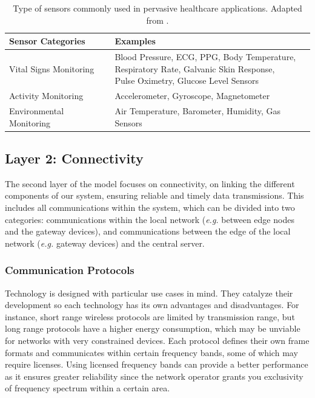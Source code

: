 \renewcommand{\arraystretch}{2}
\begin{table}[H]
    \centering
    \begin{tabular}{l|l}
        \textbf{Sensor Categories} & \textbf{Examples} \\ 
        \hline
        Vital Signs Monitoring & \makecell{Blood Pressure, \acs{ECG}, PPG, Body Temperature, \\ Respiratory Rate, Galvanic Skin Response, \\ Pulse Oximetry, Glucose Level Sensors} \\
        Activity Monitoring & Accelerometer, Gyroscope, Magnetometer\\
        Environmental Monitoring & Air Temperature, Barometer, Humidity, Gas Sensors \\
    \end{tabular}
    \caption[Type of sensors commonly used in pervasive healthcare applications.]{Type of sensors commonly used in pervasive healthcare applications. Adapted from \cite{MinhDang2019}.}
    \label{tab:layer1-sensors} 
\end{table}
\renewcommand{\arraystretch}{1}

\subsection{Layer 2: Connectivity}
\label{sec:iot-model-layer2}

The second layer of the model focuses on connectivity, on linking the different components of our system, ensuring reliable and timely data transmissions. This includes all communications within the system, which can be divided into two categories: communications within the local network (\textit{e.g.} between edge nodes and the gateway devices), and communications between the edge of the local network (\textit{e.g.} gateway devices) and the central server. \bigskip

\subsubsection{Communication Protocols}

Technology is designed with particular use cases in mind. They catalyze their development so each technology has its own advantages and disadvantages. For instance, short range wireless protocols are limited by transmission range, but long range protocols have a higher energy consumption, which may be unviable for networks with very constrained devices. Each protocol defines their own frame formats and communicates within certain frequency bands, some of which may require licenses. Using licensed frequency bands can provide a better performance as it ensures greater reliability since the network operator grants you exclusivity of frequency spectrum within a certain area. \bigskip

